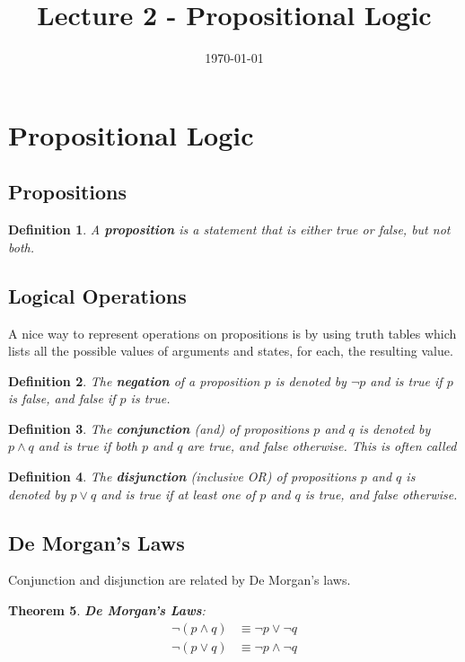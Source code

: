 \documentclass[12pt,a4paper]{article}
\title{Lecture 2 - Propositional Logic} %
\author{} %
\date{\today}
\newtheorem{theorem}{Theorem}[section]
\newtheorem{definition}[theorem]{Definition}
\begin{document}
\maketitle
\tableofcontents
\newpage

\section{Propositional Logic}
\subsection{Propositions}
\begin{definition}
A \textbf{proposition} is a statement that is either true or false, but not both.
\end{definition}

\subsection{Logical Operations}
A nice way to represent operations on propositions is by using truth tables which lists all the possible values of arguments and states, for each, the resulting value.
\begin{definition}
The \textbf{negation} of a proposition $p$ is denoted by $\neg p$ and is true if $p$ is false, and false if $p$ is true.
\end{definition}

\begin{definition}
The \textbf{conjunction} (and) of propositions $p$ and $q$ is denoted by $p \land q$ and is true if both $p$ and $q$ are true, and false otherwise.
This is often called
\end{definition}

\begin{definition}
The \textbf{disjunction} (inclusive OR) of propositions $p$ and $q$ is denoted by $p \lor q$ and is true if at least one of $p$ and $q$ is true, and false otherwise.
\end{definition}

\subsection{De Morgan's Laws}
Conjunction and disjunction are related by De Morgan's laws.
\begin{theorem}
\textbf{De Morgan's Laws}:
\begin{align*}
\neg (p \land q) &\equiv \neg p \lor \neg q \\
\neg (p \lor q) &\equiv \neg p \land \neg q
\end{align*}
\end{theorem}
\end{document}
